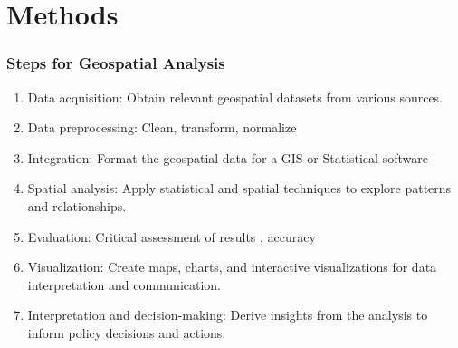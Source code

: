 \documentclass[xcolor=x11names,compress]{beamer}
\renewcommand{\(}{\begin{columns}}
\renewcommand{\)}{\end{columns}}
\newcommand{\<}[1]{\begin{column}{#1}}
\renewcommand{\>}{\end{column}}
\begin{document}
\section{Methods}

\begin{frame}
    \frametitle{Steps for Geospatial Analysis}
    \begin{enumerate}[<+->]
        \item Data acquisition: Obtain relevant geospatial datasets from various sources.
        \item Data preprocessing: Clean, transform, normalize
        \item Integration: Format the geospatial data for a GIS or Statistical software
        \item Spatial analysis: Apply statistical and spatial techniques to explore patterns and relationships.
        \item Evaluation:  Critical assessment of results , accuracy
        \item Visualization: Create maps, charts, and interactive visualizations for data interpretation and communication.
        \item Interpretation and decision-making: Derive insights from the analysis to inform policy decisions and actions.
    \end{enumerate}
\end{frame}
\end{document}
